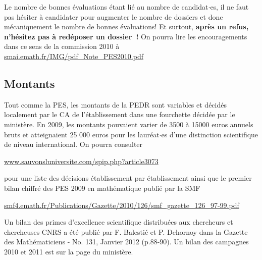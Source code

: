 
Le nombre de bonnes \'evaluations \'etant li\'e au nombre de candidat$\cdot$es, il ne faut pas h\'esiter \`a candidater
pour augmenter le nombre de dossiers et donc m\'ecaniquement le nombre de bonnes \'evaluations! Et surtout,
\textbf{apr\`es un refus, n'h\'esitez pas \`a red\'eposer un dossier~!} On pourra lire les encouragements dans ce sens de la commission 2010 \`a 
\url{smai.emath.fr/IMG/pdf\_Note\_PES2010.pdf}


\subsection{Montants}

Tout comme la PES, les montants de la PEDR sont variables et d\'ecid\'es localement par le CA de l'\'etablissement dans une fourchette d\'ecid\'ee par le minist\`ere. En 2009, les montants pouvaient varier de 3500  \`a 15000 euros annuels bruts  et atteignaient  25 000 euros pour les laur\'eat$\cdot$es d'une distinction scientifique de niveau international. 
On pourra consulter

\url{www.sauvonsluniversite.com/spip.php?article3073}

pour une liste des d\'ecisions \'etablissement par \'etablissement ainsi que le premier bilan chiffr\'e des PES  2009
en math\'ematique publi\'e par la SMF

\url{smf4.emath.fr/Publications/Gazette/2010/126/smf\_gazette\_126\_97-99.pdf}


Un bilan des primes d'excellence scientifique distribu\'ees aux chercheurs et chercheuses CNRS a \'et\'e publi\'e par F. Balesti\'e et P. Dehornoy dans la Gazette des Math\'ematiciens - No. 131, Janvier 2012 (p.88-90).
Un bilan des campagnes 2010 et 2011 est sur la page du minist\`ere.


